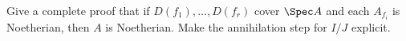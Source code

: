 \begin{problem}\label{chal:vi26-01}
Give a complete proof that if $D(f_1),\dots,D(f_r)$ cover $\Spec A$ and each $A_{f_i}$ is Noetherian, then $A$ is Noetherian.  Make the annihilation step for $I/J$ explicit.
\end{problem}
